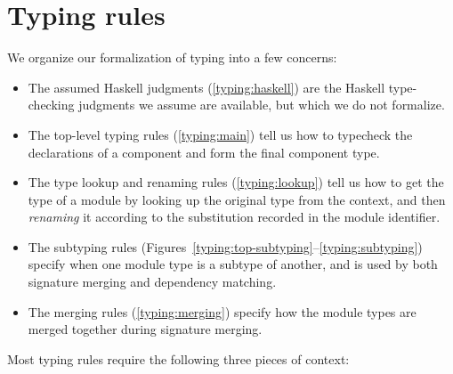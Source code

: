 \section{Typing rules}

We organize our formalization of \Backpack{} typing into a few
concerns:

\begin{itemize}
    \item The assumed Haskell judgments (\cref{typing:haskell}) are the
        Haskell type-checking judgments we assume are available, but which
        we do not formalize.

    \item The top-level typing rules (\cref{typing:main}) tell us
        how to typecheck the declarations of a component and form the final
        component type.

    \item The type lookup and renaming rules (\cref{typing:lookup}) tell us how to
        get the type of a module by looking up the original type from
        the context, and then \emph{renaming} it according to the substitution
        recorded in the module identifier.

    \item The subtyping rules (Figures~\ref{typing:top-subtyping}--\ref{typing:subtyping})
        specify when one module type is a subtype of another, and is used
        by both signature merging and dependency matching.

    \item The merging rules (\cref{typing:merging}) specify how the
        module types are merged together during signature merging.

\end{itemize}
Most typing rules require the following three pieces of context:


